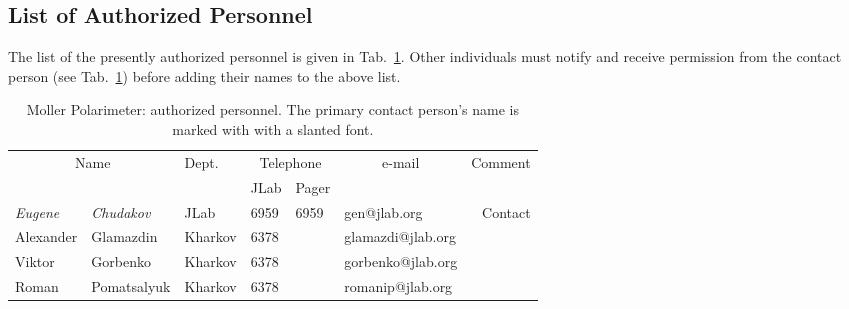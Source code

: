 \begin{safetyen}{0}{0}
\subsection{List of Authorized  Personnel}
\end{safetyen}
The list of the presently authorized personnel is given in Tab.~\ref{tab:moller:personnel}.
Other individuals must notify and receive permission from
the contact person (see Tab.~\ref{tab:moller:personnel}) before adding their names 
to the above list.

%
\begin{table}[ht]
\begin{center}
\begin{tabular}{|ll|l|l|l|l|r|} \hline
  \multicolumn{2}{|c|}{Name} & Dept. & \multicolumn{2}{c|}{Telephone} & 
  \multicolumn{1}{c|}{e-mail} & Comment \\ 
  \cline{4-5}
   &  &   & JLab & Pager &  & \\ 
\hline
 {\em Eugene} & {\em Chudakov}  & JLab    & 6959 & 6959 & gen@jlab.org      & Contact     \\ 
 Alexander    & Glamazdin       & Kharkov & 6378 &      & glamazdi@jlab.org &  \\ 
 Viktor       & Gorbenko        & Kharkov & 6378 &      & gorbenko@jlab.org &  \\ 
 Roman        & Pomatsalyuk     & Kharkov & 6378 &      & romanip@jlab.org  &  \\ 
\hline
\end{tabular}
\end{center}
\caption{Moller Polarimeter: authorized personnel. The primary contact person's
 name is marked with with a slanted font. 
}
\label{tab:moller:personnel}
\end{table}
 


